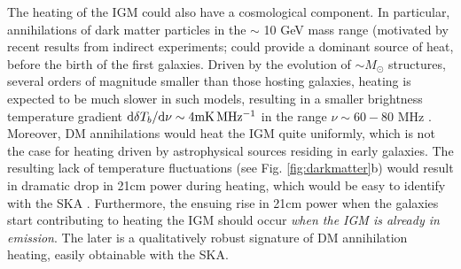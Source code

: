 \documentclass{PoS}
\newcommand{\ud}{{\rm d}}
\begin{document}
The heating of the IGM could also have a cosmological component.  In particular, annihilations of dark matter particles in the $\sim$ 10 GeV mass range (motivated by recent results from indirect experiments; \cite[e.g.][]{2009Natur.458..607A, 2010JCAP...04..014A,2013PhRvL.110n1102A}
could provide a dominant source of heat, before the birth of the first galaxies.  Driven by the evolution of $\sim M_\odot$ structures, several orders of magnitude smaller than those hosting galaxies, heating is expected to be much slower in such models, resulting in a smaller brightness temperature gradient  $\ud\delta T_b/\ud\nu \sim4 {\rm mK\, MHz^{-1}}$ in the range $\nu \sim 60 - 80$ MHz \citep{2013MNRAS.429.1705V}.  Moreover, DM annihilations would heat the IGM quite uniformly, which is not the case for heating driven by astrophysical sources residing in early galaxies.  The resulting lack of temperature fluctuations (see Fig. \ref{fig:darkmatter}b) would result in dramatic drop in 21cm power during heating, which would be easy to identify with the SKA \citep{2014arXiv1408.1109E}.  Furthermore, the ensuing rise in 21cm power when the galaxies start contributing to heating the IGM should occur {\em when the IGM is already in emission}.  The later is a qualitatively robust signature of DM annihilation heating, easily obtainable with the SKA.
\end{document}
